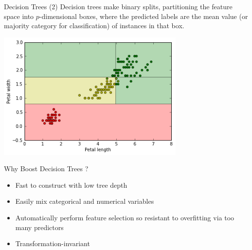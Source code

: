 \documentclass{beamer}
\begin{document}
    \begin{frame}{Decision Trees (2)}
        Decision trees make binary splits, partitioning the feature space into \alert{$p$-dimensional boxes}, where the predicted labels are the \alert{mean} value (or majority category for classification) of instances in that box.
        \begin{center}
            \includegraphics[width=0.7\textwidth]{figures/trees_fig_03.png}
        \end{center}
    \end{frame}

    \begin{frame}{Why Boost Decision Trees ?}
        \begin{itemize}
            \item Fast to construct with low tree depth
            \item Easily mix categorical and numerical variables
            \item Automatically perform feature selection so resistant to overfitting via too many predictors
            \item Transformation-invariant
        \end{itemize}
    \end{frame}
\end{document}
